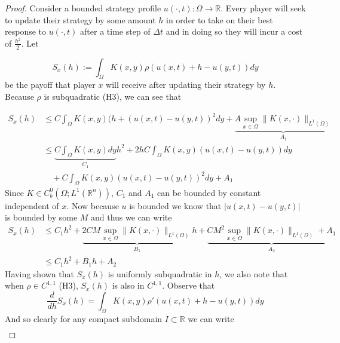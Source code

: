\documentclass[aps,
preprint,
groupedaddress,
showkeys,
amsmath]{revtex4-2}
\begin{document}
    \begin{proof}
        Consider a bounded strategy profile $u(\cdot, t):\Omega\to \mathbb{R}$. Every player will seek to update their strategy by some amount $h$ in order to take on their best response to $u(\cdot, t)$ after a time step of $\Delta t$ and in doing so they will incur a cost of $\frac{h^2}{2}$. Let 
        
       \[S_x(h):=\int_\Omega K(x,y)\rho(u(x,t)+h-u(y,t))dy\] be the payoff that player $x$ will receive after updating their strategy by $h$. Because $\rho$ is subquadratic (H3), we can see that 

        \begin{equation*}
        \begin{split}
            S_x(h)&\leq C\int_\Omega K(x,y)(h+(u(x,t)-u(y,t))^2dy+\underbrace{A\sup_{x\in\Omega}\|K(x,\cdot)\|_{L^1(\Omega)}}_{A_1}\\
            &\leq \underbrace{C\int_\Omega K(x,y)dy}_{C_1}h^2 + 2hC\int_\Omega K(x,y)(u(x,t)-u(y,t))dy\\
            &\quad +C\int_\Omega K(x,y)(u(x,t)-u(y,t))^2dy+A_1
        \end{split}
        \end{equation*}
        Since $K\in C_b^0(\Omega; L^1(\mathbb{R}^n))$, $C_1$ and $A_1$ can be bounded by constant independent of $x$. Now because $u$ is bounded we know that $|u(x,t)-u(y,t)|$ is bounded by some $M$ and thus we can write 
        \begin{equation*}
            \begin{split}
                S_x(h)&\leq C_1h^2+\underbrace{2CM\sup_{x\in\Omega}\|K(x,\cdot)\|_{L^1(\Omega)}}_{B_1}h+ \underbrace{CM^2\sup_{x\in\Omega}\|K(x,\cdot )\|_{L^1(\Omega)} + A_1}_{A_2}\\
                &\leq C_1h^2+B_1h+A_2
            \end{split}
        \end{equation*}
        Having shown that $S_x(h)$ is uniformly subquadratic in $h$, we also note that when $\rho\in C^{1,1}$ (H3), $S_x(h)$ is also in $C^{1,1}$. Observe that 
        \begin{equation*}
            \frac{d}{dh}S_x(h)=\int_\Omega K(x,y)\rho'(u(x,t)+h-u(y,t))dy
        \end{equation*}
        And so clearly for any compact subdomain $I\subset \mathbb{R}$ we can write 
        \begin{equation}\label{EQ:SinC11}
        \begin{split}

\end{split}
\end{equation}
\end{proof}
\end{document}
